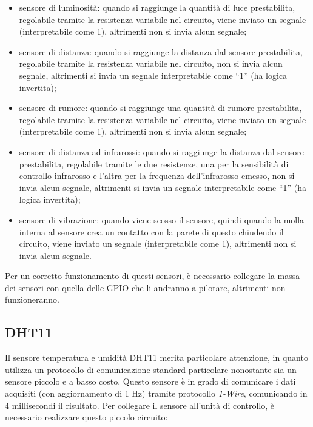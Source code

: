 \documentclass[a4paper,titlepage]{book}
\newcommand{\itema}{\begin{itemize}[noitemsep,topsep=10pt,parsep=5pt,partopsep=10pt]}
\begin{document}
\itema

\item sensore di luminosità: quando si raggiunge la quantità di luce prestabilita, regolabile tramite la resistenza variabile nel circuito, viene inviato un segnale (interpretabile come 1), altrimenti non si invia alcun segnale;

\item sensore di distanza: quando si raggiunge la distanza dal sensore prestabilita, regolabile tramite la resistenza variabile nel circuito, non si invia alcun segnale, altrimenti si invia un segnale interpretabile come ``1'' (ha logica invertita);

\item sensore di rumore: quando si raggiunge una quantità di rumore prestabilita, regolabile tramite la resistenza variabile nel circuito, viene inviato un segnale (interpretabile come 1), altrimenti non si invia alcun segnale;

\item sensore di distanza ad infrarossi: quando si raggiunge la distanza dal sensore prestabilita, regolabile tramite le due resistenze, una per la sensibilità di controllo infrarosso e l'altra per la frequenza dell'infrarosso emesso, non si invia alcun segnale, altrimenti si invia un segnale interpretabile come ``1'' (ha logica invertita);

\item sensore di vibrazione: quando viene scosso il sensore, quindi quando la molla interna al sensore crea un contatto con la parete di questo chiudendo il circuito, viene inviato un segnale (interpretabile come 1), altrimenti non si invia alcun segnale.

\end{itemize} 


Per un corretto funzionamento di questi sensori, è necessario collegare la massa dei sensori con quella delle GPIO che li andranno a pilotare, altrimenti non funzioneranno.

\subsection{DHT11}

Il sensore temperatura e umidità DHT11 merita particolare attenzione, in quanto utilizza un protocollo di comunicazione standard particolare nonostante sia un sensore piccolo e a basso costo. Questo sensore è in grado di comunicare i dati acquisiti (con aggiornamento di 1 Hz) tramite protocollo \textit{1-Wire}, comunicando in 4 millisecondi il risultato. Per collegare il sensore all'unità di controllo, è necessario realizzare questo piccolo circuito:
\end{document}
